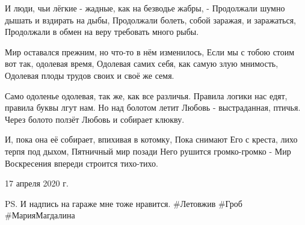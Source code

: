 И люди, чьи лёгкие - жадные, как на безводье жабры, -
Продолжали шумно дышать и вздирать на дыбы,
Продолжали болеть, собой заражая, и заражаться,
Продолжали в обмен на веру требовать много рыбы.

Мир оставался прежним, но что-то в нём изменилось,
Если мы с тобою стоим вот так, одолевая время,
Одолевая самих себя, как самую злую мнимость,
Одолевая плоды трудов своих и своё же семя.

Само одоленье одолевая, так же, как все различья.
Правила логики нас едят, правила буквы лгут нам.
Но над болотом летит Любовь - выстраданная, птичья.
Через болото ползёт Любовь и собирает клюкву.

И, пока она её собирает, впихивая в котомку,
Пока снимают Его с креста, лихо терпя под дыхом,
Пятничный мир позади Него рушится громко-громко -
Мир Воскресения впереди строится тихо-тихо.

17 апреля 2020 г.

PS. И надпись на гараже мне тоже нравится. #Летовжив #Гроб #МарияМагдалина
